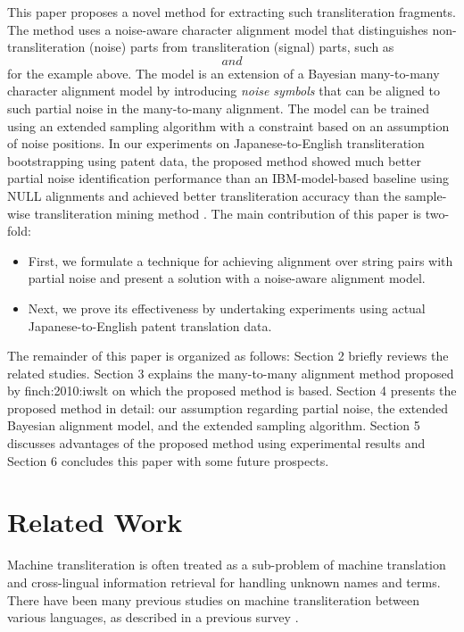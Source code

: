 \documentclass[english]{jnlp_1.4}
\def\pair#1#2{}
\newcommand{\newcite}{}
\begin{document}
This paper proposes a novel method for extracting such transliteration fragments.
The method uses a noise-aware character alignment model
that distinguishes non-transliteration (noise) parts from transliteration (signal) parts,
such as $\pair{\text{キー}}{\mathit{noise}}$ and $\pair{\text{ステム}}{\text{stem}}$ for the example above.
The model is an extension of a Bayesian many-to-many character alignment model \cite{finch:2010:iwslt}
by introducing {\em noise symbols} that can be aligned to such partial noise in the many-to-many alignment.
The model can be trained using an extended sampling algorithm with a constraint based on an assumption of noise positions.
In our experiments on Japanese-to-English transliteration bootstrapping using patent data,
the proposed method showed much better partial noise identification performance
than an IBM-model-based baseline using NULL alignments
and achieved better transliteration accuracy than the sample-wise transliteration mining method \cite{sajjad:2012:acl}.
The main contribution of this paper is two-fold:
\begin{itemize}
\item First, we formulate a technique for achieving alignment over string pairs with partial noise and present a solution with a noise-aware alignment model.
\item Next, we prove its effectiveness by undertaking experiments using actual Japanese-to-English patent translation data.
\end{itemize}

The remainder of this paper is organized as follows:
Section 2 briefly reviews the related studies.
Section 3 explains the many-to-many alignment method proposed by \newcite{finch:2010:iwslt} on which the proposed method is based.
Section 4 presents the proposed method in detail: our assumption regarding partial noise, the extended Bayesian alignment model,
and the extended sampling algorithm.
Section 5 discusses advantages of the proposed method using experimental results and
Section 6 concludes this paper with some future prospects.


\section{Related Work}

Machine transliteration is often treated as a sub-problem
of machine translation and cross-lingual information retrieval
for handling unknown names and terms.
There have been many previous studies on machine transliteration between various languages,
as described in a previous survey \cite{karimi:2011:acmcs}.
\end{document}
